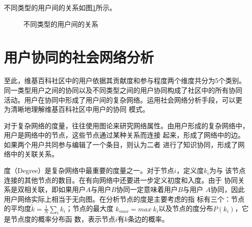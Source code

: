 不同类型的用户间的关系如图\ref{fig:user-cat}所示。
\begin{figure}[htb]
  \centering
  \caption{\small{不同类型的用户间的关系}}
  \label{fig:user-cat}
\end{figure}
\section{用户协同的社会网络分析}
\label{sec:social-analysis}


至此，维基百科社区中的用户依据其贡献度和参与程度两个维度共分为5个类别。
同一类型用户之间的协同以及不同类型之间的用户协同构成了社区中的所有协同
活动。用户在协同中形成了用户间的复杂网络。运用社会网络分析手段，可以更
为清晰地理解维基百科社区中用户的协同
模式。

对于复杂网络的度量，往往使用图论来研究网络属性。由用户形成的复杂网络中，用户是网络中的节点，这些节点通过某种关系而连接
起来，形成了网络中的边。如果两个用户共同参与编辑了一个条目，则认为二者
进行了知识协同，形成了网络中的关联关系。

度（Degree）是复杂网络中最重要的度量之一。对于节点$i$，定义度$k_i$为与
该节点连接的其他节点的数目。在有向网络中还要进一步定义初度和入度。由于
协同关系是双相关联，即如果用户$A$与用户$B$协同一定意味着用户$B$与用户
$A$协同，因此用户网络实际上相当于无向图。在分析节点的度是主要考虑的指
标有三个：节点的平均度$\tilde{ k}=\frac{1}{N}\sum_i k_i$；节点的最大度
$k_{max}=max \  k_i$以及节点的度分布$P(k_i)$，它是节点度的概率分布函
数，表示节点$i$有$k$条边的概率。

